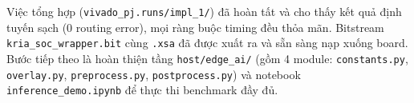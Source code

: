 Việc tổng hợp (\texttt{vivado\_pj.runs/impl\_1/}) đã hoàn tất và cho thấy kết quả định tuyến sạch (0 routing error), mọi ràng buộc timing đều thỏa mãn. Bitstream \texttt{kria\_soc\_wrapper.bit} cùng \texttt{.xsa} đã được xuất ra và sẵn sàng nạp xuống board. Bước tiếp theo là hoàn thiện tầng \texttt{host/edge\_ai/} (gồm 4 module: \texttt{constants.py}, \texttt{overlay.py}, \texttt{preprocess.py}, \texttt{postprocess.py}) và notebook \texttt{inference\_demo.ipynb} để thực thi benchmark đầy đủ.
